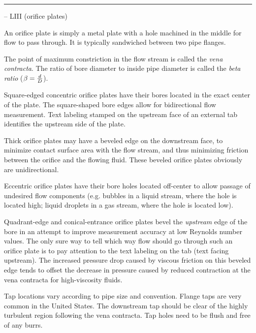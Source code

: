 \filbreak \vskip 5pt \hrule \vskip 5pt  -- LIII (orifice plates) \vskip 10pt

An orifice plate is simply a metal plate with a hole machined in the middle for flow to pass through.  It is typically sandwiched between two pipe flanges.

\vskip 10pt

The point of maximum constriction in the flow stream is called the {\it vena contracta}.  The ratio of bore diameter to inside pipe diameter is called the {\it beta ratio} ($\beta = {d \over D}$).

\vskip 10pt

Square-edged concentric orifice plates have their bores located in the exact center of the plate.  The square-shaped bore edges allow for bidirectional flow measurement.  Text labeling stamped on the upstream face of an external tab identifies the upstream side of the plate.

\vskip 10pt

Thick orifice plates may have a beveled edge on the downstream face, to minimize contact surface area with the flow stream, and thus minimizing friction between the orifice and the flowing fluid.  These beveled orifice plates obviously are unidirectional.

\vskip 10pt

Eccentric orifice plates have their bore holes located off-center to allow passage of undesired flow components (e.g. bubbles in a liquid stream, where the hole is located high; liquid droplets in a gas stream, where the hole is located low).

\vskip 10pt

Quadrant-edge and conical-entrance orifice plates bevel the {\it upstream} edge of the bore in an attempt to improve measurement accuracy at low Reynolds number values.  The only sure way to tell which way flow should go through such an orifice plate is to pay attention to the text labeling on the tab (text facing upstream).  The increased pressure drop caused by viscous friction on this beveled edge tends to offset the decrease in pressure caused by reduced contraction at the vena contracta for high-viscosity fluids.

\vskip 10pt

Tap locations vary according to pipe size and convention.  Flange taps are very common in the United States.  The downstream tap should be clear of the highly turbulent region following the vena contracta.  Tap holes need to be flush and free of any burrs.

